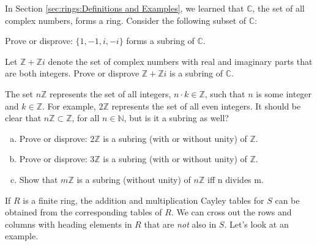 In Section \ref{sec:rings:Definitions and Examples}, we learned that ${\mathbb C}$, the set of all complex numbers, forms a ring.  Consider the following subset of ${\mathbb C}$:

\begin{exercise}{}
Prove or disprove:  $\{1,-1,i,-i\}$ forms a subring of ${\mathbb C}$.
\end{exercise}

\begin{exercise}{}
Let ${\mathbb Z}+{\mathbb Z}i$ denote the set of complex numbers with real and imaginary parts that are both integers. Prove or disprove ${\mathbb Z}+{\mathbb Z}i$ is a subring of ${\mathbb C}$.
\end{exercise}

The set $n{\mathbb Z}$ represents the set of all integers, $n\cdot k\in{\mathbb Z}$, such that $n$ is some integer and $k\in{\mathbb Z}$.  For example, $2{\mathbb Z}$ represents the set of all even integers.  It should be clear that $n{\mathbb Z}\subset{\mathbb Z}$, for all $n\in{\mathbb N}$, but is it a subring as well?

\begin{exercise}{}
\begin{enumerate}[(a)]
\item Prove or disprove: $2{\mathbb Z}$ is a subring (with or without unity)  of ${\mathbb Z}$.
\item Prove or disprove: $3{\mathbb Z}$ is a subring (with or without unity)  of ${\mathbb Z}$.
\item Show that $m{\mathbb Z}$ is a subring (without unity) of $n{\mathbb Z}$ iff n divides m.
\end{enumerate}
\end{exercise}

If $R$ is a finite ring, the addition and multiplication Cayley tables for $S$ can be obtained from the corresponding tables of $R$. We can cross out the rows and columns with heading elements in $R$ that are \emph{not} also in $S$. Let's look at an example.

